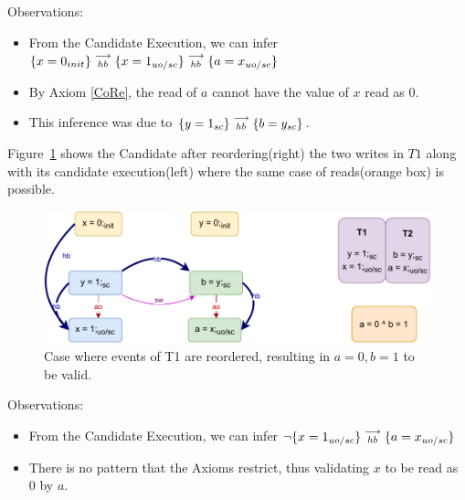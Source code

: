         Observations:
        \begin{itemize}
            \item From the Candidate Execution, we can infer $\{x=0_{init}\}\stackrel{\longrightarrow}{_{hb}}\{x=1_{uo/sc}\}\stackrel{\longrightarrow}{_{hb}}\{a=x_{uo/sc}\}$
            \item By Axiom \ref{CoRe}, the read of $a$ cannot have the value of $x$ read as $0$. 
            \item This inference was due to $\{y=1_{sc}\}\stackrel{\longrightarrow}{_{hb}}\{b=y_{sc}\}$.
        \end{itemize}

        Figure~\ref{reord_counter:example4(b)} shows the Candidate after reordering(right) the two writes in $T1$ along with its candidate execution(left) where the same case of reads(orange box) is possible. 
        \begin{figure}[H]
            \centering
            \includegraphics[scale=0.7]{4.InstructionReordering/4.ValidReorderingCandidate/Example7R(Wuo,sc-Wsc).pdf}
            \caption{Case where events of T1 are reordered, resulting in $a = 0,  b = 1$ to be valid.}
            \label{reord_counter:example4(b)}
        \end{figure}
        
        Observations:
        \begin{itemize}
            \item From the Candidate Execution, we can infer $\neg\{x=1_{uo/sc}\}\stackrel{\longrightarrow}{_{hb}}\{a=x_{uo/sc}\}$
            \item There is no pattern that the Axioms restrict, thus validating $x$ to be read as $0$ by $a$. 
        \end{itemize}